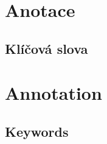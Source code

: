 \documentclass{template/socthesis}
\author{Šimon Hrouda}
\begin{document}
\newcommand{\bardgen}[3]{following text generated by~ai~(google bard) on~#1\\%
  \begin{tcolorbox}[breakable, colback=blue!20]
    #2
  \end{tcolorbox}
  \begin{tcolorbox}[breakable, colback=blue!10, colframe=white]
    #3
  \end{tcolorbox}
}


\maketitle



\pagestyle{empty}

\section*{Anotace}


\subsection*{Klíčová slova}


\vspace{20mm}

\section*{Annotation}


\subsection*{Keywords}


\newpage

\tableofcontents %
\pagestyle{empty}

\setcounter{figure}{0}
\setcounter{table}{0}

\newpage
\pagestyle{plain}



% 


\end{document}
